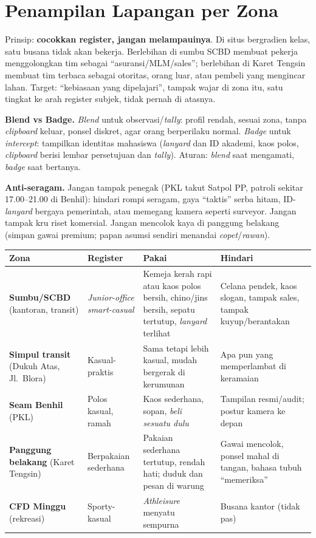 \documentclass[11pt,a4paper]{report}
\begin{document}
\chapter{Penampilan Lapangan per Zona}
Prinsip: \textbf{cocokkan register, jangan melampauinya}. Di situs bergradien kelas, satu
busana tidak akan bekerja. Berlebihan di sumbu SCBD membuat pekerja menggolongkan tim
sebagai ``asuransi/MLM/sales''; berlebihan di Karet Tengsin membuat tim terbaca sebagai
otoritas, orang luar, atau pembeli yang mengincar lahan. Target: ``kebiasaan yang
dipelajari'', tampak wajar di zona itu, satu tingkat ke arah register subjek, tidak pernah
di atasnya.

\smallskip\noindent\textbf{Blend vs Badge.} \emph{Blend} untuk observasi/\emph{tally}:
profil rendah, sesuai zona, tanpa \emph{clipboard} keluar, ponsel diskret, agar orang
berperilaku normal. \emph{Badge} untuk \emph{intercept}: tampilkan identitas mahasiswa
(\emph{lanyard} dan ID akademi, kaos polos, \emph{clipboard} berisi lembar persetujuan dan
\emph{tally}). Aturan: \emph{blend} saat mengamati, \emph{badge} saat bertanya.

\smallskip\noindent\textbf{Anti-seragam.} Jangan tampak penegak (PKL takut Satpol PP,
patroli sekitar 17.00--21.00 di Benhil): hindari rompi seragam, gaya ``taktis'' serba
hitam, ID-\emph{lanyard} bergaya pemerintah, atau memegang kamera seperti surveyor. Jangan
tampak kru riset komersial. Jangan mencolok kaya di panggung belakang (simpan gawai premium;
papan asumsi sendiri menandai \emph{copet}/\emph{rawan}).

\begin{longtable}{@{}p{2.8cm}p{2.8cm}p{4.0cm}p{3.4cm}@{}}
\toprule
\textbf{Zona} & \textbf{Register} & \textbf{Pakai} & \textbf{Hindari} \\
\midrule
\endhead
\textbf{Sumbu/SCBD} (kantoran, transit) & \emph{Junior-office smart-casual} & Kemeja kerah rapi atau kaos polos bersih, chino/jins bersih, sepatu tertutup, \emph{lanyard} terlihat & Celana pendek, kaos slogan, tampak sales, tampak kuyup/berantakan \\
\addlinespace
\textbf{Simpul transit} (Dukuh Atas, Jl.\ Blora) & Kasual-praktis & Sama tetapi lebih kasual, mudah bergerak di kerumunan & Apa pun yang memperlambat di keramaian \\
\addlinespace
\textbf{Seam Benhil} (PKL) & Polos kasual, ramah & Kaos sederhana, sopan, \emph{beli sesuatu dulu} & Tampilan resmi/audit; postur kamera ke depan \\
\addlinespace
\textbf{Panggung belakang} (Karet Tengsin) & Berpakaian sederhana & Pakaian sederhana tertutup, rendah hati; duduk dan pesan di warung & Gawai mencolok, ponsel mahal di tangan, bahasa tubuh ``memeriksa'' \\
\addlinespace
\textbf{CFD Minggu} (rekreasi) & Sporty-kasual & \emph{Athleisure} menyatu sempurna & Busana kantor (tidak pas) \\
\bottomrule
\end{longtable}
\end{document}

